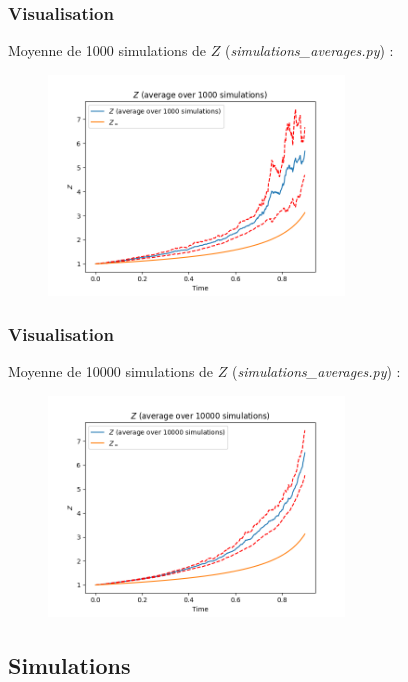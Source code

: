 \documentclass{beamer}
\begin{document}
\begin{frame}
\frametitle{Visualisation}
\par Moyenne de 1000 simulations de $Z$ (\emph{simulations\_averages.py}) : 
\begin{figure}[H]
  \centering
    \includegraphics[width=0.7\textwidth]{images/average_1000.png}
  \caption{}
\end{figure}
\end{frame}

\begin{frame}
\frametitle{Visualisation}
\par Moyenne de 10000 simulations de $Z$ (\emph{simulations\_averages.py}) : 
\begin{figure}[H]
  \centering
    \includegraphics[width=0.7\textwidth]{images/average_10000.png}
  \caption{}
\end{figure}
\end{frame}

\subsection{Simulations}
\end{document}
